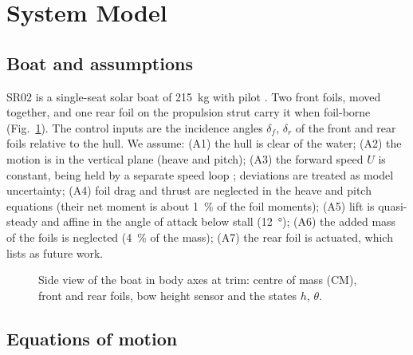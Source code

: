 \documentclass[conference]{IEEEtran}
\begin{document}
\section{System Model}
\label{sec:model}

\subsection{Boat and assumptions}

SR02 is a single-seat solar boat of \SI{215}{kg} with pilot \cite{belime}. Two
front foils, moved together, and one rear foil on the propulsion strut carry
it when foil-borne (Fig.~\ref{fig:boat}). The control inputs are the incidence
angles $\delta_f$, $\delta_r$ of the front and rear foils relative to the hull.
We assume:
(A1) the hull is clear of the water;
(A2) the motion is in the vertical plane (heave and pitch);
(A3) the forward speed $U$ is constant, being held by a separate speed loop
\cite{belime}; deviations are treated as model uncertainty;
(A4) foil drag and thrust are neglected in the heave and pitch equations (their
net moment is about \SI{1}{\percent} of the foil moments);
(A5) lift is quasi-steady and affine in the angle of attack below stall
(\SI{12}{\degree});
(A6) the added mass of the foils is neglected (\SI{4}{\percent} of the mass);
(A7) the rear foil is actuated, which \cite{belime} lists as future work.

\begin{figure}[t]
\centering

\caption{Side view of the boat in body axes at trim: centre of mass (CM),
front and rear foils, bow height sensor and the states $h$, $\theta$.}
\label{fig:boat}
\end{figure}

\subsection{Equations of motion}
\end{document}
